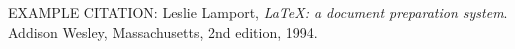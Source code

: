 \begin{thebibliography}{9}

EXAMPLE CITATION:  Leslie Lamport,
  \emph{\LaTeX: a document preparation system}.
  Addison Wesley, Massachusetts,
  2nd edition,
  1994.

\end{thebibliography}
